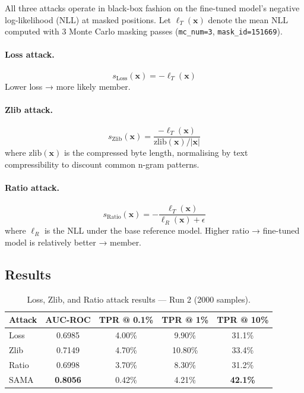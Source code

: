\documentclass[11pt,a4paper]{article}
\begin{document}
All three attacks operate in black-box fashion on the fine-tuned model's
negative log-likelihood (NLL) at masked positions.  Let
$\ell_T(\mathbf{x})$ denote the mean NLL computed with 3 Monte Carlo masking
passes (\texttt{mc\_num=3}, \texttt{mask\_id=151669}).

\paragraph{Loss attack.}
\[
  s_{\text{Loss}}(\mathbf{x}) = -\ell_T(\mathbf{x})
\]
Lower loss → more likely member.

\paragraph{Zlib attack.}
\[
  s_{\text{Zlib}}(\mathbf{x}) = \frac{-\ell_T(\mathbf{x})}{\text{zlib}(\mathbf{x}) / |\mathbf{x}|}
\]
where $\text{zlib}(\mathbf{x})$ is the compressed byte length, normalising by
text compressibility to discount common n-gram patterns.

\paragraph{Ratio attack.}
\[
  s_{\text{Ratio}}(\mathbf{x}) = -\frac{\ell_T(\mathbf{x})}{\ell_R(\mathbf{x}) + \epsilon}
\]
where $\ell_R$ is the NLL under the base reference model.  Higher ratio → fine-tuned
model is relatively better → member.

\subsection{Results}

\begin{table}[H]
\centering
\caption{Loss, Zlib, and Ratio attack results — Run 2 (2000 samples).}
\label{tab:baselines_r2}
\begin{tabular}{lcccc}
\toprule
Attack & AUC-ROC & TPR @ 0.1\% & TPR @ 1\% & TPR @ 10\% \\
\midrule
Loss   & 0.6985 & 4.00\% & 9.90\%  & 31.1\% \\
Zlib   & 0.7149 & 4.70\% & 10.80\% & 33.4\% \\
Ratio  & 0.6998 & 3.70\% & 8.30\%  & 31.2\% \\
\midrule
SAMA   & \textbf{0.8056} & 0.42\% & 4.21\% & \textbf{42.1\%} \\
\bottomrule
\end{tabular}
\end{table}
\end{document}
